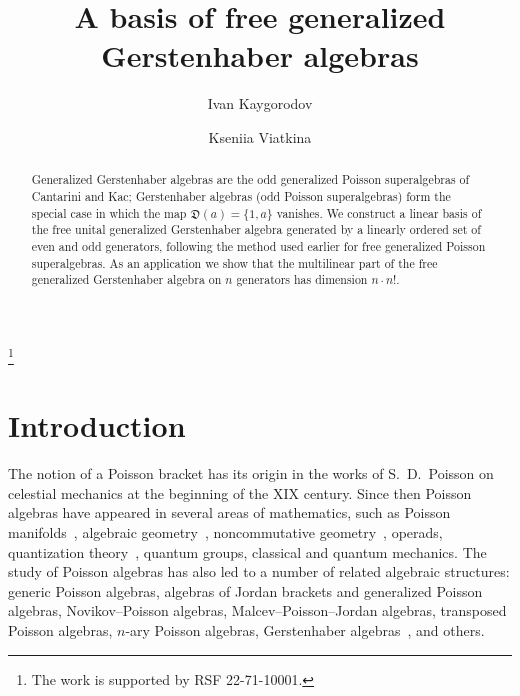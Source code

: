 \documentclass[11pt,reqno]{amsart}
\newcommand{\D}{\mathfrak D}
\theoremstyle{plain}
\theoremstyle{definition}
\theoremstyle{remark}
\begin{document}
\title{A basis of free generalized Gerstenhaber algebras}

\author{Ivan Kaygorodov}
\address{CMA-UBI, Universidade da Beira Interior, Covilh\~a, Portugal}

\author{Kseniia Viatkina}
\address{Saint Petersburg University, Saint Petersburg, Russia}

\thanks{The work is supported by RSF 22-71-10001.}


\begin{abstract}
Generalized Gerstenhaber algebras are the odd generalized Poisson superalgebras of Cantarini and Kac; Gerstenhaber algebras (odd Poisson superalgebras) form the special case in which the map $\D(a)=\{1,a\}$ vanishes.
We construct a linear basis of the free unital generalized Gerstenhaber algebra generated by a linearly ordered set of even and odd generators, following the method used earlier for free generalized Poisson superalgebras.
As an application we show that the multilinear part of the free generalized Gerstenhaber algebra on $n$ generators has dimension $n\cdot n!$.
\end{abstract}

\maketitle

\section{Introduction}

The notion of a Poisson bracket has its origin in the works of S.~D.~Poisson on celestial mechanics at the beginning of the XIX century.
Since then Poisson algebras have appeared in several areas of mathematics, such as Poisson manifolds~\cite{L1}, algebraic geometry~\cite{BLLM,GK04}, noncommutative geometry~\cite{ber08}, operads, quantization theory~\cite{Kon03}, quantum groups, classical and quantum mechanics.
The study of Poisson algebras has also led to a number of related algebraic structures: generic Poisson algebras, algebras of Jordan brackets and generalized Poisson algebras, Novikov--Poisson algebras, Malcev--Poisson--Jordan algebras, transposed Poisson algebras, $n$-ary Poisson algebras, Gerstenhaber algebras~\cite{K96}, and others.
\end{document}
